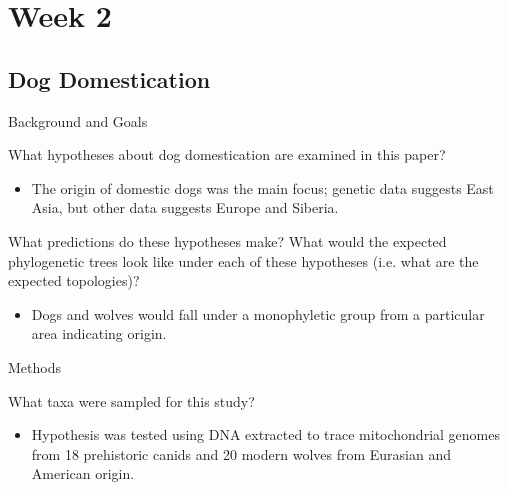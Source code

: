 \documentclass[12pt,a4paper]{article}
\begin{document}
\tableofcontents
\cleardoublepage
\fancyhead{}


\clearpage
\section*{Week 2}
{}
\subsection{Dog Domestication}
\begin{itemize}
    \item Background and Goals
        \begin{itemize}
            {\color{darklc} \item What hypotheses about dog domestication are examined in this paper?}
                \begin{itemize}
                    \item The origin of domestic dogs was the main focus; genetic data suggests East Asia, but other data suggests Europe and Siberia. 
                \end{itemize}
            {\color{darklc} \item  What predictions do these hypotheses make? What would the expected phylogenetic trees look like under each of these hypotheses (i.e. what are the expected topologies)?}
                \begin{itemize}
                    \item Dogs and wolves would fall under a monophyletic group from a particular area indicating origin.
                \end{itemize}
        \end{itemize}
    \item Methods
        \begin{itemize}
            {\color{darklc} \item  What taxa were sampled for this study?} 
                \begin{itemize}
                    \item Hypothesis was tested using DNA extracted to trace mitochondrial genomes from 18 prehistoric canids and 20 modern wolves from Eurasian and American origin. 

\end{itemize}
\end{itemize}
\end{itemize}
\end{document}
